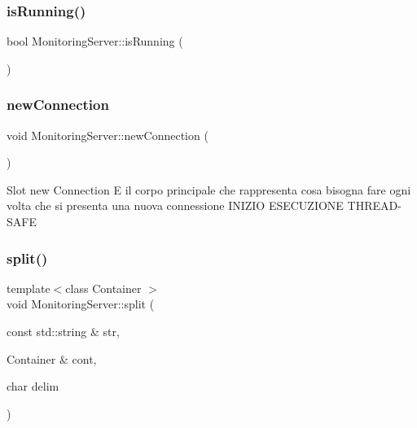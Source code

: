 \subsubsection{\texorpdfstring{is\+Running()}{isRunning()}}
{\footnotesize\ttfamily bool Monitoring\+Server\+::is\+Running (\begin{DoxyParamCaption}{ }\end{DoxyParamCaption})}

\mbox{\label{class_monitoring_server_a54ae4688c3cb974fdb690f095b9ef5cf}} 
\subsubsection{\texorpdfstring{new\+Connection}{newConnection}}
{\footnotesize\ttfamily void Monitoring\+Server\+::new\+Connection (\begin{DoxyParamCaption}{ }\end{DoxyParamCaption})\hspace{0.3cm}{\ttfamily [slot]}}

Slot new Connection E\textquotesingle{} il corpo principale che rappresenta cosa bisogna fare ogni volta che si presenta una nuova connessione I\+N\+I\+Z\+IO E\+S\+E\+C\+U\+Z\+I\+O\+NE T\+H\+R\+E\+A\+D-\/\+S\+A\+FE \mbox{\label{class_monitoring_server_a1398ffaaddcc6859474083c353975581}} 
\subsubsection{\texorpdfstring{split()}{split()}}
{\footnotesize\ttfamily template$<$class Container $>$ \\
void Monitoring\+Server\+::split (\begin{DoxyParamCaption}\item[{const std\+::string \&}]{str,  }\item[{Container \&}]{cont,  }\item[{char}]{delim }\end{DoxyParamCaption})}

\mbox{\label{class_monitoring_server_a1d242318daca890ae72cd675694a6411}} 
